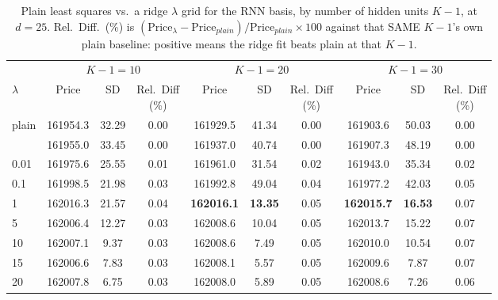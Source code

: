 \begin{table}

\caption{\label{tab:rnn_ridge_lambda_d25}Plain least squares vs.\ a ridge $\lambda$ grid for the RNN basis, by number of hidden units $K-1$, at $d=25$. Rel.\ Diff.\ (\%) is $(\text{Price}_\lambda - \text{Price}_{plain})/\text{Price}_{plain} \times 100$ against that SAME $K-1$'s own plain baseline: positive means the ridge fit beats plain at that $K-1$.}
\footnotesize
\setlength{\tabcolsep}{3pt}
\centering
\begin{tabular}[t]{lccccccccc}
\toprule
\multicolumn{1}{c}{ } & \multicolumn{3}{c}{$K-1 = 10$} & \multicolumn{3}{c}{$K-1 = 20$} & \multicolumn{3}{c}{$K-1 = 30$} \\
\cmidrule(l{3pt}r{3pt}){2-4} \cmidrule(l{3pt}r{3pt}){5-7} \cmidrule(l{3pt}r{3pt}){8-10}
$\lambda$ & Price & SD & \shortstack{Rel.\ Diff\\(\%)} & Price & SD & \shortstack{Rel.\ Diff\\(\%)} & Price & SD & \shortstack{Rel.\ Diff\\(\%)}\\
\midrule
plain & 161954.3 & 32.29 & 0.00 & 161929.5 & 41.34 & 0.00 & 161903.6 & 50.03 & 0.00\\
\addlinespace
0.001 & 161955.0 & 33.45 & 0.00 & 161937.0 & 40.74 & 0.00 & 161907.3 & 48.19 & 0.00\\
0.01 & 161975.6 & 25.55 & 0.01 & 161961.0 & 31.54 & 0.02 & 161943.0 & 35.34 & 0.02\\
0.1 & 161998.5 & 21.98 & 0.03 & \textcolor{priceorange}{161992.8} & 49.04 & 0.04 & 161977.2 & 42.03 & 0.05\\
1 & \textcolor{priceorange}{162016.3} & 21.57 & 0.04 & \textbf{\textcolor{priceorange}{162016.1}} & \textbf{\textcolor{sdblue}{13.35}} & 0.05 & \textbf{\textcolor{priceorange}{162015.7}} & \textbf{\textcolor{sdblue}{16.53}} & 0.07\\
5 & 162006.4 & \textcolor{sdblue}{12.27} & 0.03 & 162008.6 & \textcolor{sdblue}{10.04} & 0.05 & \textcolor{priceorange}{162013.7} & 15.22 & 0.07\\
10 & 162007.1 & \textcolor{sdblue}{9.37} & 0.03 & 162008.6 & \textcolor{sdblue}{7.49} & 0.05 & 162010.0 & \textcolor{sdblue}{10.54} & 0.07\\
15 & 162006.6 & \textcolor{sdblue}{7.83} & 0.03 & 162008.1 & \textcolor{sdblue}{5.57} & 0.05 & 162009.6 & \textcolor{sdblue}{7.87} & 0.07\\
20 & 162007.8 & \textcolor{sdblue}{6.75} & 0.03 & 162008.0 & \textcolor{sdblue}{5.89} & 0.05 & 162008.6 & \textcolor{sdblue}{7.26} & 0.06\\
\bottomrule
\end{tabular}


\end{table}
